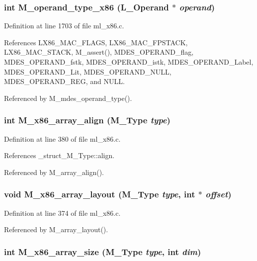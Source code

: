 \subsubsection{\setlength{\rightskip}{0pt plus 5cm}int M\_\-operand\_\-type\_\-x86 (L\_\-Operand $\ast$ {\em operand})}\label{ml__x86_8c_a9876dd91246fda74bd1d64d44d42b91}




Definition at line 1703 of file ml\_\-x86.c.

References LX86\_\-MAC\_\-FLAGS, LX86\_\-MAC\_\-FPSTACK, LX86\_\-MAC\_\-STACK, M\_\-assert(), MDES\_\-OPERAND\_\-flag, MDES\_\-OPERAND\_\-fstk, MDES\_\-OPERAND\_\-istk, MDES\_\-OPERAND\_\-Label, MDES\_\-OPERAND\_\-Lit, MDES\_\-OPERAND\_\-NULL, MDES\_\-OPERAND\_\-REG, and NULL.

Referenced by M\_\-mdes\_\-operand\_\-type().
\subsubsection{\setlength{\rightskip}{0pt plus 5cm}int M\_\-x86\_\-array\_\-align (\bf{M\_\-Type} {\em type})}\label{ml__x86_8c_4783d37d75647a65f606c2330917101a}




Definition at line 380 of file ml\_\-x86.c.

References \_\-struct\_\-M\_\-Type::align.

Referenced by M\_\-array\_\-align().
\subsubsection{\setlength{\rightskip}{0pt plus 5cm}void M\_\-x86\_\-array\_\-layout (\bf{M\_\-Type} {\em type}, int $\ast$ {\em offset})}\label{ml__x86_8c_52a40ee0827e72a61aaff2223ea5ff4c}




Definition at line 374 of file ml\_\-x86.c.

Referenced by M\_\-array\_\-layout().
\subsubsection{\setlength{\rightskip}{0pt plus 5cm}int M\_\-x86\_\-array\_\-size (\bf{M\_\-Type} {\em type}, int {\em dim})}\label{ml__x86_8c_0ea09e63dca52af5779b9fdf0c0dd552}




